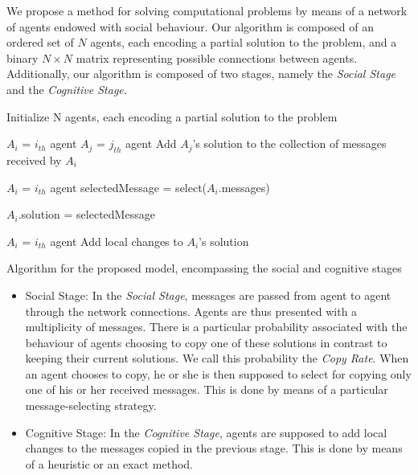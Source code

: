 \documentclass{article}
\begin{document}
We propose a method for solving computational problems by means of a network of agents endowed with social behaviour. Our algorithm is composed of an ordered set of $N$ agents, each encoding a partial solution to the problem, and a binary $N \times N$ matrix representing possible connections between agents. Additionally, our algorithm is composed of two stages, namely the {\em Social Stage} and the {\em Cognitive Stage}. %

\begin{algorithm}
 \SetAlgoLined
 Initialize N agents, each encoding a partial solution to the problem\;
 {
 	{
 		{
 			{
 				$A_{i}$ = $i_{th}$ agent\;
 				$A_{j}$ = $j_{th}$ agent\;
 				Add $A_{j}$'s solution to the collection of messages received by $A_{i}$\; %
 			}
 		}
 	}
 	{
 		\;
 		$A_{i}$ = $i_{th}$ agent\;
 		selectedMessage = select($A_{i}$.messages)\;
 		
 		{
 			$A_{i}$.solution = selectedMessage\;
 		}
 	}
 	{
 		\;
 		$A_{i}$ = $i_{th}$ agent\;
 		Add local changes to $A_{i}$'s solution%
 	}
 }
 \caption{Algorithm for the proposed model, encompassing the social and cognitive stages}
\end{algorithm}

\begin{itemize}
\item
Social Stage: In the {\em Social Stage}, messages are passed from agent to agent through the network connections. Agents are thus presented with a multiplicity of messages. There is a particular probability associated with the behaviour of agents choosing to copy one of these solutions in contrast to keeping their current solutions. We call this probability the {\em Copy Rate}. When an agent chooses to copy, he or she is then supposed to select for copying only one of his or her received messages. This is done by means of a particular message-selecting strategy.

\item
Cognitive Stage: In the {\em Cognitive Stage}, agents are supposed to add local changes to the messages copied in the previous stage. This is done by means of a heuristic or an exact method.
\end{itemize}
\end{document}
